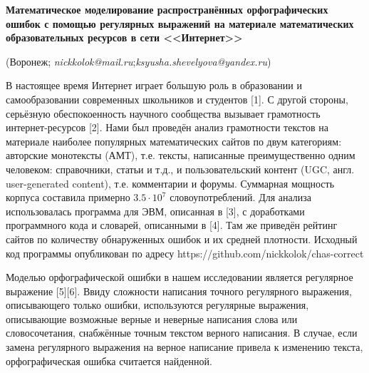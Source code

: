\begin{center}{
	\bf
	Математическое моделирование распространённых орфографических ошибок
	с помощью регулярных выражений на материале математических образовательных ресурсов в сети <<Интернет>>
} \\



\vzmscaption
(Воронеж; {\it nickkolok@mail.ru};{\it ksyusha.shevelyova@yandex.ru})
\end{center}

\setcounter{table}{0}


В настоящее время Интернет играет большую роль в образовании и самообразовании современных школьников и студентов [1].
С другой стороны, серьёзную обеспокоенность научного сообщества вызывает грамотность интернет-ресурсов [2].
Нами был проведён анализ грамотности текстов на материале наиболее популярных математических сайтов по двум категориям:
авторские монотексты (АМТ), т.е. тексты, написанные преимущественно одним человеком: справочники, статьи и т.д.,
и пользовательский контент
\linebreak
(UGC, англ. user-generated content), т.е. комментарии и форумы.
Суммарная мощность корпуса составила примерно $3.5\cdot 10^7$ словоупотреблений.
Для анализа использовалась программа для ЭВМ, описанная в [3], с доработками программного кода и словарей, описанными в [4].
Там же приведён рейтинг сайтов по количеству обнаруженных ошибок и их средней плотности.
Исходный код программы опубликован по адресу https://github.com/nickkolok/chas-correct

Моделью орфографической ошибки в нашем исследовании является регулярное выражение [5][6].
Ввиду сложности написания точного регулярного выражения,
описывающего только ошибки, используются регулярные выражения,
описывающие возможные верные и неверные написания слова или словосочетания,
снабжённые точным текстом верного написания.
В случае, если замена регулярного выражения на верное написание привела к изменению текста,
орфографическая ошибка считается найденной.

